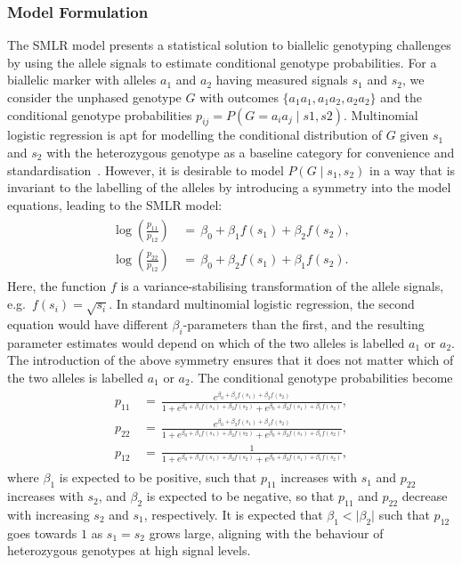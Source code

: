 \documentclass[preprint,5p,times,11pt]{elsarticle}
\begin{document}
\subsubsection{Model Formulation}
The SMLR model presents a statistical solution to biallelic genotyping challenges by using the allele signals to estimate conditional genotype probabilities.
For a biallelic marker with alleles $a_1$ and $a_2$ having measured signals $s_1$ and $s_2$, we consider the unphased genotype $G$ with outcomes $\{a_1a_1, a_1a_2, a_2a_2\}$ and the conditional genotype probabilities $p_{ij} = P\left(G = a_i a_j \mid s1, s2 \right)$.
Multinomial logistic regression is apt for modelling the conditional distribution of $G$ given $s_1$ and $s_2$ with the heterozygous genotype as a baseline category for convenience and standardisation~\cite[p.~293]{agresti}.
However, it is desirable to model $P(G \mid s_1, s_2)$ in a way that is invariant to the labelling of the alleles by introducing a symmetry into the model equations, leading to the SMLR model:
\begin{align}\label{eq:smlr}
\begin{split}
\log\left(\frac{p_{11}}{p_{12}}\right) \, &= \, \beta_0 + \beta_1 f(s_1) + \beta_2 f(s_2), \\
\log\left(\frac{p_{22}}{p_{12}}\right) \, &= \, \beta_0 + \beta_2 f(s_1) + \beta_1 f(s_2).
\end{split}
\end{align}
Here, the function $f$ is a variance-stabilising transformation of the allele signals, e.g.~$f(s_i) = \sqrt{s_i}$.
In standard multinomial logistic regression, the second equation would have different $\beta_i$-parameters than the first, and the resulting parameter estimates would depend on which of the two alleles is labelled $a_1$ or $a_2$.
The introduction of the above symmetry ensures that it does not matter which of the two alleles is labelled $a_1$ or $a_2$.
The conditional genotype probabilities become
\begin{align}\label{eq:posterior}
\begin{split}
p_{11} \, &= \, \frac{e^{\beta_0 + \beta_1 f(s_1) + \beta_2 f(s_2) }}{1 + e^{\beta_0 + \beta_1 f(s_1) + \beta_2 f(s_2)} + e^{\beta_0 + \beta_2 f(s_1) + \beta_1 f(s_2)}}, \\
p_{22} \, &= \, \frac{e^{\beta_0 + \beta_2 f(s_1) + \beta_1 f(s_2) }}{1 + e^{\beta_0 + \beta_1 f(s_1) + \beta_2 f(s_2)} + e^{\beta_0 + \beta_2 f(s_1) + \beta_1 f(s_2)}}, \\
p_{12} \, &= \, \frac{1}{1 + e^{\beta_0 + \beta_1 f(s_1) + \beta_2 f(s_2)} + e^{\beta_0 + \beta_2 f(s_1) + \beta_1 f(s_2)}},
\end{split}
\end{align}
where $\beta_1$ is expected to be positive, such that $p_{11}$ increases with $s_1$ and $p_{22}$ increases with $s_2$, and $\beta_2$ is expected to be negative, so that $p_{11}$ and $p_{22}$ decrease with increasing $s_2$ and $s_1$, respectively.
It is expected that $\beta_1 < \lvert \beta_2 \rvert$ such that $p_{12}$ goes towards $1$ as $s_1 = s_2$ grows large, aligning with the behaviour of heterozygous genotypes at high signal levels.
\end{document}
